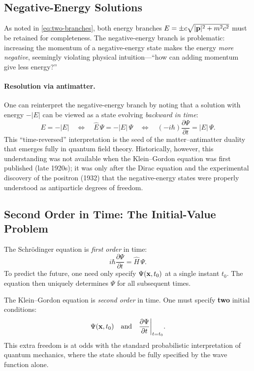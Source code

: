 \documentclass[12pt, a4paper]{article}
\theoremstyle{definition}
\begin{document}
\subsection{Negative-Energy Solutions}

As noted in \eqref{eq:two-branches}, both energy branches $E = \pm
c\sqrt{|\vb{p}|^{2}+m^{2}c^{2}}$ must be retained for completeness.
The negative-energy branch is problematic: increasing the momentum of a
negative-energy state makes the energy \emph{more negative}, seemingly
violating physical intuition---``how can adding momentum give less energy?''

\paragraph{Resolution via antimatter.}
One can reinterpret the negative-energy branch by noting that a solution with
energy $-|E|$ can be viewed as a state evolving \emph{backward in time}:
\begin{equation}
    E = -|E|
    \quad\Longleftrightarrow\quad
    \hat{E}\,\Psi = -|E|\,\Psi
    \quad\Longleftrightarrow\quad
    (-i\hbar)\frac{\partial\Psi}{\partial t} = |E|\,\Psi.
\end{equation}
This ``time-reversed'' interpretation is the seed of the matter--antimatter
duality that emerges fully in quantum field theory.  Historically, however,
this understanding was not available when the Klein--Gordon equation was first
published (late 1920s); it was only after the Dirac equation and the
experimental discovery of the positron (1932) that the negative-energy states
were properly understood as antiparticle degrees of freedom.

\subsection{Second Order in Time: The Initial-Value Problem}

The Schr\"{o}dinger equation is \emph{first order} in time:
\begin{equation}
    i\hbar\frac{\partial\Psi}{\partial t} = \hat{H}\,\Psi.
\end{equation}
To predict the future, one need only specify $\Psi(\vb{x},t_{0})$ at a
single instant $t_{0}$.  The equation then uniquely determines $\Psi$ for all
subsequent times.

The Klein--Gordon equation is \emph{second order} in time.  One must specify
\textbf{two} initial conditions:
\begin{equation}
    \Psi(\vb{x},t_{0})
    \quad\text{and}\quad
    \frac{\partial\Psi}{\partial t}\bigg|_{t=t_{0}}.
\end{equation}
This extra freedom is at odds with the standard probabilistic interpretation
of quantum mechanics, where the state should be fully specified by the wave
function alone.
\end{document}
